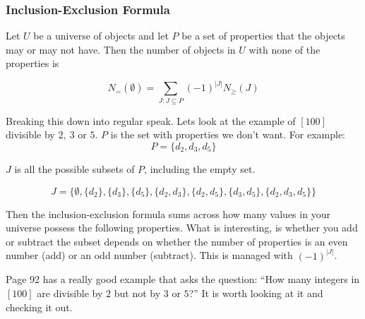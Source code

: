 \documentclass{article}
\begin{document}
\subsubsection{Inclusion-Exclusion Formula}

\begin{thm}
Let $U$ be a universe of objects and let $P$ be a set of properties that the objects may or may not have. Then the number of objects in $U$ with none of the properties is

\begin{equation*}
    N_{=}(\emptyset) = \sum_{J:J \subseteq P} (-1)^{|J|} N_{\ge}(J)
\end{equation*}
\end{thm}

Breaking this down into regular speak. Lets look at the example of $[100]$ divisible by $2, \: 3$ or $5$. $P$ is the set with properties we don't want. For example:
\begin{equation*}
    P = \{d_2, d_3, d_5\}
\end{equation*}

$J$ is all the possible subsets of $P$, including the empty set.

\begin{equation*}
    J = \{\emptyset, \{d_2\}, \{d_3\}, \{d_5\}, \{d_2, d_3\}, \{d_2, d_5\}, \{d_3, d_5\}, \{d_2, d_3, d_5\}\}
\end{equation*}

Then the inclusion-exclusion formula sums across how many values in your universe possess the following properties. What is interesting, is whether you add or subtract the subset depends on whether the number of properties is an even number (add) or an odd number (subtract). This is managed with $(-1)^{|J|}$.

\medskip
Page 92 has a really good example that asks the question: ``How many integers in $[100]$ are divisible by $2$ but not by $3$ or $5$?'' It is worth looking at it and checking it out.
\end{document}

